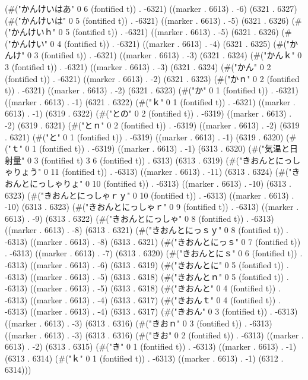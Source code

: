 (#("かんけいはあ" 0 6 (fontified t)) . -6321) ((marker . 6613) . -6) (6321 . 6327) (#("かんけいは" 0 5 (fontified t)) . -6321) ((marker . 6613) . -5) (6321 . 6326) (#("かんけいｈ" 0 5 (fontified t)) . -6321) ((marker . 6613) . -5) (6321 . 6326) (#("かんけい" 0 4 (fontified t)) . -6321) ((marker . 6613) . -4) (6321 . 6325) (#("かんけ" 0 3 (fontified t)) . -6321) ((marker . 6613) . -3) (6321 . 6324) (#("かんｋ" 0 3 (fontified t)) . -6321) ((marker . 6613) . -3) (6321 . 6324) (#("かん" 0 2 (fontified t)) . -6321) ((marker . 6613) . -2) (6321 . 6323) (#("かｎ" 0 2 (fontified t)) . -6321) ((marker . 6613) . -2) (6321 . 6323) (#("か" 0 1 (fontified t)) . -6321) ((marker . 6613) . -1) (6321 . 6322) (#("ｋ" 0 1 (fontified t)) . -6321) ((marker . 6613) . -1) (6319 . 6322) (#("との" 0 2 (fontified t)) . -6319) ((marker . 6613) . -2) (6319 . 6321) (#("とｎ" 0 2 (fontified t)) . -6319) ((marker . 6613) . -2) (6319 . 6321) (#("と" 0 1 (fontified t)) . -6319) ((marker . 6613) . -1) (6319 . 6320) (#("ｔ" 0 1 (fontified t)) . -6319) ((marker . 6613) . -1) (6313 . 6320) (#("気温と日射量" 0 3 (fontified t) 3 6 (fontified t)) . 6313) (6313 . 6319) (#("きおんとにっしゃりょう" 0 11 (fontified t)) . -6313) ((marker . 6613) . -11) (6313 . 6324) (#("きおんとにっしゃりょ" 0 10 (fontified t)) . -6313) ((marker . 6613) . -10) (6313 . 6323) (#("きおんとにっしゃｒｙ" 0 10 (fontified t)) . -6313) ((marker . 6613) . -10) (6313 . 6323) (#("きおんとにっしゃｒ" 0 9 (fontified t)) . -6313) ((marker . 6613) . -9) (6313 . 6322) (#("きおんとにっしゃ" 0 8 (fontified t)) . -6313) ((marker . 6613) . -8) (6313 . 6321) (#("きおんとにっｓｙ" 0 8 (fontified t)) . -6313) ((marker . 6613) . -8) (6313 . 6321) (#("きおんとにっｓ" 0 7 (fontified t)) . -6313) ((marker . 6613) . -7) (6313 . 6320) (#("きおんとにｓ" 0 6 (fontified t)) . -6313) ((marker . 6613) . -6) (6313 . 6319) (#("きおんとに" 0 5 (fontified t)) . -6313) ((marker . 6613) . -5) (6313 . 6318) (#("きおんとｎ" 0 5 (fontified t)) . -6313) ((marker . 6613) . -5) (6313 . 6318) (#("きおんと" 0 4 (fontified t)) . -6313) ((marker . 6613) . -4) (6313 . 6317) (#("きおんｔ" 0 4 (fontified t)) . -6313) ((marker . 6613) . -4) (6313 . 6317) (#("きおん" 0 3 (fontified t)) . -6313) ((marker . 6613) . -3) (6313 . 6316) (#("きおｎ" 0 3 (fontified t)) . -6313) ((marker . 6613) . -3) (6313 . 6316) (#("きお" 0 2 (fontified t)) . -6313) ((marker . 6613) . -2) (6313 . 6315) (#("き" 0 1 (fontified t)) . -6313) ((marker . 6613) . -1) (6313 . 6314) (#("ｋ" 0 1 (fontified t)) . -6313) ((marker . 6613) . -1) (6312 . 6314)))
